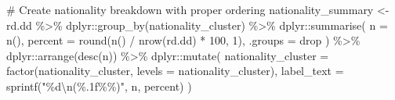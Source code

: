 \documentclass[
  12pt,
  letterpaper,
  DIV=11,
  numbers=noendperiod]{scrartcl}
\newenvironment{Shaded}{\begin{snugshade}}{\end{snugshade}}
\newcommand{\AttributeTok}[1]{\textcolor[rgb]{0.40,0.45,0.13}{#1}}
\newcommand{\CommentTok}[1]{\textcolor[rgb]{0.37,0.37,0.37}{#1}}
\newcommand{\DecValTok}[1]{\textcolor[rgb]{0.68,0.00,0.00}{#1}}
\newcommand{\FunctionTok}[1]{\textcolor[rgb]{0.28,0.35,0.67}{#1}}
\newcommand{\NormalTok}[1]{\textcolor[rgb]{0.00,0.23,0.31}{#1}}
\newcommand{\OtherTok}[1]{\textcolor[rgb]{0.00,0.23,0.31}{#1}}
\newcommand{\SpecialCharTok}[1]{\textcolor[rgb]{0.37,0.37,0.37}{#1}}
\newcommand{\StringTok}[1]{\textcolor[rgb]{0.13,0.47,0.30}{#1}}
\theoremstyle{plain}
\theoremstyle{definition}
\begin{document}
\begin{Shaded}
\begin{Highlighting}[]
\CommentTok{\# Create nationality breakdown with proper ordering}
\NormalTok{nationality\_summary }\OtherTok{\textless{}{-}}\NormalTok{ rd.dd }\SpecialCharTok{\%\textgreater{}\%}
\NormalTok{  dplyr}\SpecialCharTok{::}\FunctionTok{group\_by}\NormalTok{(nationality\_cluster) }\SpecialCharTok{\%\textgreater{}\%}
\NormalTok{  dplyr}\SpecialCharTok{::}\FunctionTok{summarise}\NormalTok{(}
    \AttributeTok{n =} \FunctionTok{n}\NormalTok{(),}
    \AttributeTok{percent =} \FunctionTok{round}\NormalTok{(}\FunctionTok{n}\NormalTok{() }\SpecialCharTok{/} \FunctionTok{nrow}\NormalTok{(rd.dd) }\SpecialCharTok{*} \DecValTok{100}\NormalTok{, }\DecValTok{1}\NormalTok{),}
    \AttributeTok{.groups =} \StringTok{\textquotesingle{}drop\textquotesingle{}}
\NormalTok{  ) }\SpecialCharTok{\%\textgreater{}\%}
\NormalTok{  dplyr}\SpecialCharTok{::}\FunctionTok{arrange}\NormalTok{(}\FunctionTok{desc}\NormalTok{(n)) }\SpecialCharTok{\%\textgreater{}\%}
\NormalTok{  dplyr}\SpecialCharTok{::}\FunctionTok{mutate}\NormalTok{(}
    \AttributeTok{nationality\_cluster =} \FunctionTok{factor}\NormalTok{(nationality\_cluster, }\AttributeTok{levels =}\NormalTok{ nationality\_cluster),}
    \AttributeTok{label\_text =} \FunctionTok{sprintf}\NormalTok{(}\StringTok{"\%d}\SpecialCharTok{\textbackslash{}n}\StringTok{(\%.1f\%\%)"}\NormalTok{, n, percent)}
\NormalTok{  )}


\end{Highlighting}
\end{Shaded}
\end{document}
